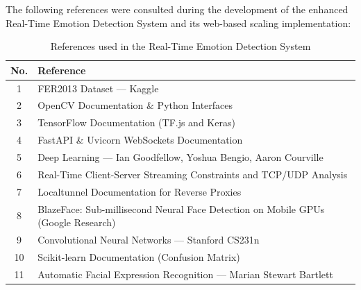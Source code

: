 \documentclass[12pt,a4paper]{report}
\begin{document}
The following references were consulted during the development of the enhanced
Real-Time Emotion Detection System and its web-based scaling implementation:

\begin{table}[h]
\centering
\begin{tabular}{|c|p{11cm}|}
\hline
\textbf{No.} & \textbf{Reference} \\
\hline
1 & FER2013 Dataset — Kaggle \\
\hline
2 & OpenCV Documentation \& Python Interfaces \\
\hline
3 & TensorFlow Documentation (TF.js and Keras) \\
\hline
4 & FastAPI \& Uvicorn WebSockets Documentation \\
\hline
5 & Deep Learning — Ian Goodfellow, Yoshua Bengio, Aaron Courville \\
\hline
6 & Real-Time Client-Server Streaming Constraints and TCP/UDP Analysis \\
\hline
7 & Localtunnel Documentation for Reverse Proxies \\
\hline
8 & BlazeFace: Sub-millisecond Neural Face Detection on Mobile GPUs (Google Research) \\
\hline
9 & Convolutional Neural Networks — Stanford CS231n \\
\hline
10 & Scikit-learn Documentation (Confusion Matrix) \\
\hline
11 & Automatic Facial Expression Recognition — Marian Stewart Bartlett \\
\hline
\end{tabular}
\caption{References used in the Real-Time Emotion Detection System}
\end{table}
\end{document}
